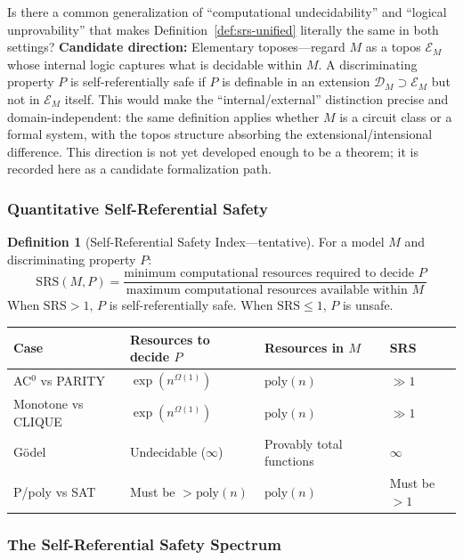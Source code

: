 \documentclass[11pt,a4paper]{article}
\theoremstyle{plain}
\theoremstyle{definition}
\newtheorem{definition}[theorem]{Definition}
\theoremstyle{remark}
\newcommand{\SRS}{\mathrm{SRS}}
\begin{document}
Is there a common generalization of ``computational undecidability'' and ``logical unprovability'' that makes Definition~\ref{def:srs-unified} literally the same in both settings? \textbf{Candidate direction:} Elementary toposes---regard $M$ as a topos $\mathcal{E}_M$ whose internal logic captures what is decidable within $M$. A discriminating property $P$ is self-referentially safe if $P$ is definable in an extension $\mathcal{D}_M \supset \mathcal{E}_M$ but not in $\mathcal{E}_M$ itself. This would make the ``internal/external'' distinction precise and domain-independent: the same definition applies whether $M$ is a circuit class or a formal system, with the topos structure absorbing the extensional/intensional difference. This direction is not yet developed enough to be a theorem; it is recorded here as a candidate formalization path.

\subsubsection{Quantitative Self-Referential Safety}

\begin{definition}[Self-Referential Safety Index---tentative]
For a model $M$ and discriminating property $P$:
$$\SRS(M, P) = \frac{\text{minimum computational resources required to decide } P}{\text{maximum computational resources available within } M}$$
When $\SRS > 1$, $P$ is self-referentially safe. When $\SRS \leq 1$, $P$ is unsafe.
\end{definition}

\begin{table}[h]
\centering
\begin{tabular}{@{}llll@{}}
\toprule
Case & Resources to decide $P$ & Resources in $M$ & SRS \\
\midrule
AC$^0$ vs PARITY & $\exp(n^{\Omega(1)})$ & $\mathrm{poly}(n)$ & $\gg 1$ \\
Monotone vs CLIQUE & $\exp(n^{\Omega(1)})$ & $\mathrm{poly}(n)$ & $\gg 1$ \\
G\"{o}del & Undecidable ($\infty$) & Provably total functions & $\infty$ \\
P/poly vs SAT & Must be $> \mathrm{poly}(n)$ & $\mathrm{poly}(n)$ & Must be $> 1$ \\
\bottomrule
\end{tabular}
\end{table}

\subsubsection{The Self-Referential Safety Spectrum}
\end{document}

